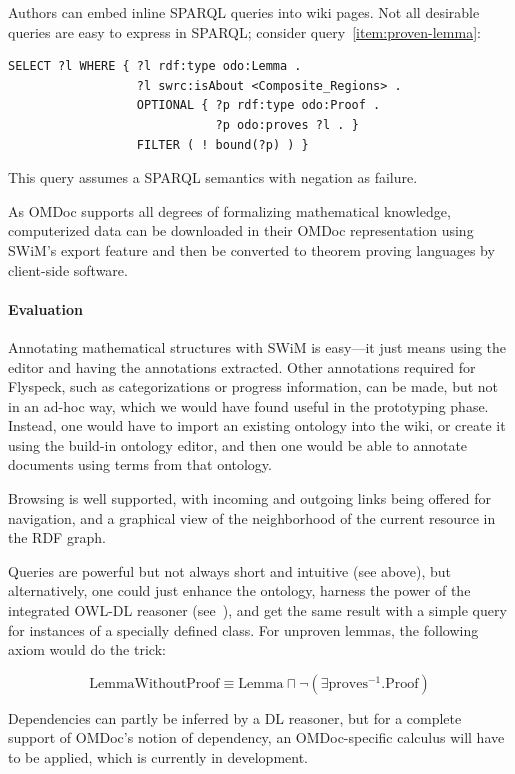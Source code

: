 Authors can embed inline SPARQL queries into wiki pages.  Not all desirable
queries are easy to express in SPARQL; consider query~\ref{item:proven-lemma}:

\begin{lstlisting}
SELECT ?l WHERE { ?l rdf:type odo:Lemma .
                  ?l swrc:isAbout <Composite_Regions> .
                  OPTIONAL { ?p rdf:type odo:Proof .
                             ?p odo:proves ?l . }
                  FILTER ( ! bound(?p) ) }
\end{lstlisting}

This query assumes a SPARQL semantics with negation as
failure\cite{Polleres:SPARQL-Rules07}.

As OMDoc supports all degrees of formalizing mathematical knowledge,
computerized data can be downloaded in their OMDoc representation using SWiM's
export feature and then be converted to theorem proving languages by client-side
software\cite[chap.\ 25.2]{Kohlhase:omdoc1.2}.

\paragraph{Evaluation} Annotating mathematical structures with SWiM is easy---it
just means using the editor and having the annotations extracted.  Other
annotations required for Flyspeck, such as categorizations or progress
information, can be made, but not in an ad-hoc way, which we would have found
useful in the prototyping phase.  Instead, one would have to import an existing
ontology into the wiki, or create it using the build-in ontology editor, and
then one would be able to annotate documents using terms from that ontology.

Browsing is well supported, with incoming and outgoing links being offered for
navigation, and a graphical view of the neighborhood of the current resource in
the RDF graph.

Queries are powerful but not always short and intuitive (see above), but
alternatively, one could just enhance the ontology, harness the power of the
integrated  OWL-DL reasoner
(see~\cite{KrSchVr:semwiki-reasoning07}), and get the same result with a simple
query for instances of a specially defined class.  For unproven lemmas, the
following axiom would do the trick:

\[
\mbox{LemmaWithoutProof}\equiv\mbox{Lemma}\sqcap\neg(\exists\mbox{proves}^{-1}.\mbox{Proof})
\]

Dependencies can partly be inferred by a DL reasoner, but for a complete support
of OMDoc's notion of dependency, an OMDoc-specific calculus will have to be
applied, which is currently in development.

